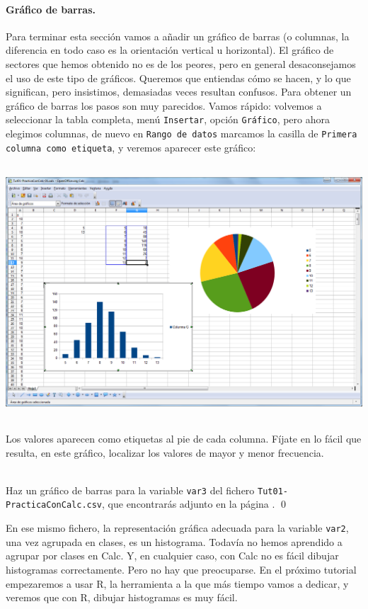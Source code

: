 \documentclass[10pt,a4paper]{article}\usepackage[]{graphicx}\usepackage[]{color}
\newcounter {cont01}
\begin{document}
\paragraph{Gráfico de barras.} Para terminar esta sección vamos a añadir un gráfico de barras (o columnas, la diferencia en todo caso es la orientación vertical u horizontal). El gráfico de sectores que hemos obtenido no es de los peores, pero en general desaconsejamos el uso de este tipo de gráficos. Queremos que entiendas cómo se hacen, y lo que significan, pero insistimos, demasiadas veces resultan confusos. Para obtener un gráfico de barras los pasos son muy parecidos. Vamos rápido: volvemos a seleccionar la tabla completa,
menú {\tt Insertar}, opción {\tt Gráfico}, pero ahora elegimos columnas, de nuevo en {\tt Rango de datos} marcamos la
casilla de {\tt Primera columna como etiqueta}, y veremos aparecer este gráfico:
    \begin{center}
    \includegraphics[height=9.5cm]{../fig/Tut01-Calc-Graficos-06.png}
    \end{center}
Los valores aparecen como etiquetas al pie de cada columna. Fíjate en lo fácil que resulta, en este gráfico, localizar los valores de mayor y menor frecuencia.

\begin{ejercicio}
\quad\\
Haz un gráfico de barras para la variable {\tt var3} del fichero {\tt Tut01-PracticaConCalc.csv}, que encontrarás adjunto en la página \pageref{tut01:sec:TablasFrecuenciaSencillas}.
\qed
\end{ejercicio}

En ese mismo fichero, la representación gráfica adecuada para la variable {\tt var2}, una vez agrupada en clases, es un histograma. Todavía no hemos aprendido a agrupar por clases en Calc. Y, en cualquier caso, con Calc no es fácil dibujar histogramas correctamente. Pero no hay que preocuparse. En el próximo tutorial empezaremos a usar R, la herramienta a la que más tiempo vamos a dedicar, y veremos que con R, dibujar histogramas es muy fácil.
\end{document}

